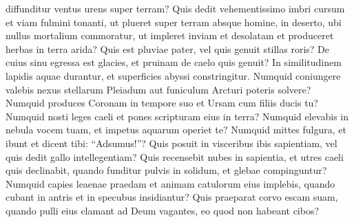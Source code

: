 \begin{biblechapter}
\begin{biblechapter}
\begin{biblechapter}
\begin{biblechapter}
\begin{biblechapter}
\begin{biblechapter}
\begin{biblechapter}
\begin{biblechapter}
\begin{biblechapter}
\begin{biblechapter}
\begin{biblechapter}
\begin{biblechapter}
\begin{biblechapter}
\begin{biblechapter}
\begin{biblechapter}
\begin{biblechapter}
\begin{biblechapter}
\begin{biblechapter}
\begin{biblechapter}
\begin{biblechapter}
\begin{biblechapter}
\begin{biblechapter}
\begin{biblechapter}
\begin{biblechapter}
\begin{biblechapter}
\begin{biblechapter}
\begin{biblechapter}
\begin{biblechapter}
\begin{biblechapter}
\begin{biblechapter}
\begin{biblechapter}
\begin{biblechapter}
\begin{biblechapter}
\begin{biblechapter}
\begin{biblechapter}
\begin{biblechapter}
\begin{biblechapter}
\begin{biblechapter}
 diffunditur ventus urens super terram?
 \verse Quis dedit vehementissimo imbri cursum
 et viam fulmini tonanti,
 \verse ut plueret super terram absque homine,
 in deserto, ubi nullus mortalium commoratur,
 \verse ut impleret inviam et desolatam
 et produceret herbas in terra arida?
 \verse Quis est pluviae pater,
 vel quis genuit stillas roris?
 \verse De cuius sinu egressa est glacies,
 et pruinam de caelo quis genuit?
 \verse In similitudinem lapidis aquae durantur,
 et superficies abyssi constringitur.
 \verse Numquid coniungere valebis nexus stellarum Pleiadum
 aut funiculum Arcturi poteris solvere?
 \verse Numquid produces Coronam in tempore suo
 et Ursam cum filiis ducis tu?
 \verse Numquid nosti leges caeli
 et pones scripturam eius in terra?
 \verse Numquid elevabis in nebula vocem tuam,
 et impetus aquarum operiet te?
 \verse Numquid mittes fulgura, et ibunt
 et dicent tibi: “Adsumus!”?
 \verse Quis posuit in visceribus ibis sapientiam,
 vel quis dedit gallo intellegentiam?
 \verse Quis recensebit nubes in sapientia,
 et utres caeli quis declinabit,
 \verse quando funditur pulvis in solidum,
 et glebae compinguntur?
 \verse Numquid capies leaenae praedam
 et animam catulorum eius implebis,
 \verse quando cubant in antris
 et in specubus insidiantur?
 \verse Quis praeparat corvo escam suam,
 quando pulli eius clamant ad Deum vagantes,
 eo quod non habeant cibos?
 

\end{biblechapter}
\end{biblechapter}
\end{biblechapter}
\end{biblechapter}
\end{biblechapter}
\end{biblechapter}
\end{biblechapter}
\end{biblechapter}
\end{biblechapter}
\end{biblechapter}
\end{biblechapter}
\end{biblechapter}
\end{biblechapter}
\end{biblechapter}
\end{biblechapter}
\end{biblechapter}
\end{biblechapter}
\end{biblechapter}
\end{biblechapter}
\end{biblechapter}
\end{biblechapter}
\end{biblechapter}
\end{biblechapter}
\end{biblechapter}
\end{biblechapter}
\end{biblechapter}
\end{biblechapter}
\end{biblechapter}
\end{biblechapter}
\end{biblechapter}
\end{biblechapter}
\end{biblechapter}
\end{biblechapter}
\end{biblechapter}
\end{biblechapter}
\end{biblechapter}
\end{biblechapter}
\end{biblechapter}
